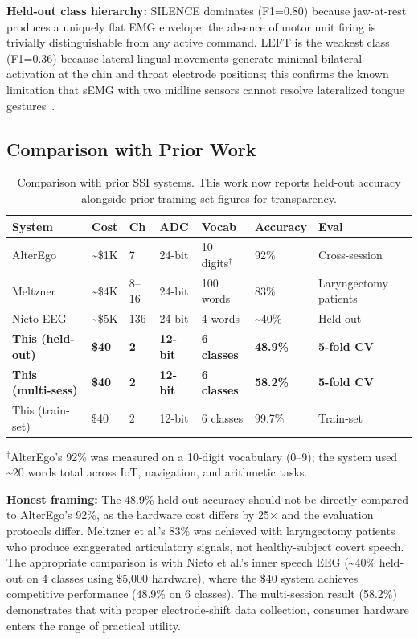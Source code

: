 \documentclass{article}
\begin{document}
\textbf{Held-out class hierarchy:} SILENCE dominates (F1=0.80) because jaw-at-rest produces a uniquely flat EMG envelope; the absence of motor unit firing is trivially distinguishable from any active command. LEFT is the weakest class (F1=0.36) because lateral lingual movements generate minimal bilateral activation at the chin and throat electrode positions; this confirms the known limitation that sEMG with two midline sensors cannot resolve lateralized tongue gestures~\cite{meltzner2017}.

\subsection{Comparison with Prior Work}

\begin{table}[h]
\centering
\caption{Comparison with prior SSI systems. This work now reports held-out accuracy alongside prior training-set figures for transparency.}
\label{tab:comparison}
\begin{tabular}{@{}lllllll@{}}
\toprule
System & Cost & Ch & ADC & Vocab & Accuracy & Eval \\
\midrule
AlterEgo~\cite{kapur2018} & \textasciitilde\$1K & 7 & 24-bit & 10 digits$^\dagger$ & 92\% & Cross-session \\
Meltzner~\cite{meltzner2017} & \textasciitilde\$4K & 8--16 & 24-bit & 100 words & 83\% & Laryngectomy patients \\
Nieto EEG~\cite{nieto2022} & \textasciitilde\$5K & 136 & 24-bit & 4 words & \textasciitilde40\% & Held-out \\
\textbf{This (held-out)} & \textbf{\$40} & \textbf{2} & \textbf{12-bit} & \textbf{6 classes} & \textbf{48.9\%} & \textbf{5-fold CV} \\
\textbf{This (multi-sess)} & \textbf{\$40} & \textbf{2} & \textbf{12-bit} & \textbf{6 classes} & \textbf{58.2\%} & \textbf{5-fold CV} \\
This (train-set) & \$40 & 2 & 12-bit & 6 classes & 99.7\% & Train-set \\
\bottomrule
\end{tabular}
\end{table}

$^\dagger$AlterEgo's 92\% was measured on a 10-digit vocabulary (0--9); the system used \textasciitilde20 words total across IoT, navigation, and arithmetic tasks.

\textbf{Honest framing:} The 48.9\% held-out accuracy should not be directly compared to AlterEgo's 92\%, as the hardware cost differs by 25$\times$ and the evaluation protocols differ. Meltzner et al.'s 83\% was achieved with laryngectomy patients who produce exaggerated articulatory signals, not healthy-subject covert speech. The appropriate comparison is with Nieto et al.'s inner speech EEG (\textasciitilde40\% held-out on 4 classes using \$5,000 hardware), where the \$40 system achieves competitive performance (48.9\% on 6 classes). The multi-session result (58.2\%) demonstrates that with proper electrode-shift data collection, consumer hardware enters the range of practical utility.
\end{document}
